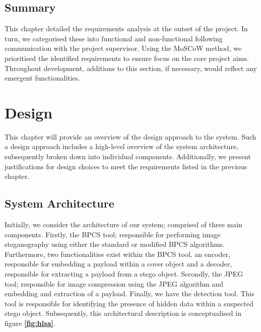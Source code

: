 \documentclass{l4proj}
\begin{document}
\section{Summary}

This chapter detailed the requirements analysis at the outset of the project. In turn, we categorised these into functional and non-functional following communication with the project supervisor. Using the MoSCoW method, we prioritised the identified requirements to ensure focus on the core project aims. Throughout development, additions to this section, if necessary, would reflect any emergent functionalities.

\chapter{Design} \label{Design}

This chapter will provide an overview of the design approach to the system. Such a design approach includes a high-level overview of the system architecture, subsequently broken down into individual components. Additionally, we present justifications for design choices to meet the requirements listed in the previous chapter. 

\section{System Architecture}\label{Architecture}

Initially, we consider the architecture of our system; comprised of three main components. Firstly, the BPCS tool; responsible for performing image steganography using either the standard or modified BPCS algorithms. Furthermore, two functionalities exist within the BPCS tool, an encoder, responsible for embedding a payload within a cover object and a decoder, responsible for extracting a payload from a stego object. Secondly, the JPEG tool; responsible for image compression using the JPEG algorithm and embedding and extraction of a payload. Finally, we have the detection tool. This tool is responsible for identifying the presence of hidden data within a suspected stego object. Subsequently, this architectural description is conceptualised in figure \textbf{\ref{fig:hlsa}}.
\end{document}
